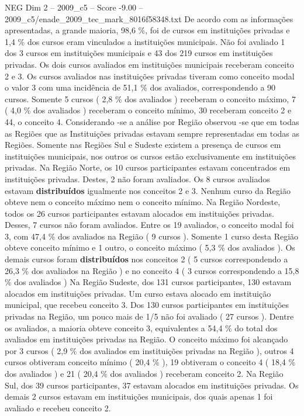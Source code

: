 \begin{textsample}{NEG Dim 2 – 2009\_c5 – Score -9.00 – 2009\_c5/enade\_2009\_tec\_mark\_8016f58348.txt}
De acordo com as informações apresentadas, a grande maioria, 98,6 \%, foi de cursos em instituições privadas e 1,4 \% dos cursos eram vinculados a instituições municipais.
Não foi avaliado 1 dos 3 cursos em instituições municipais e 43 dos 219 cursos em instituições privadas.
Os dois cursos avaliados em instituições municipais receberam conceito 2 e 3.
Os cursos avaliados nas instituições privadas tiveram como conceito modal o valor 3 com uma incidência de 51,1 \% dos avaliados, correspondendo a 90 cursos.
Somente 5 cursos ( 2,8 \% dos avaliados ) receberam o conceito máximo, 7 ( 4,0 \% dos avaliados ) receberam o conceito mínimo, 30 receberam conceito 2 e 44, o conceito 4.
Considerando -se a análise por Região observou -se que em todas as Regiões que as Instituições privadas estavam sempre representadas em todas as Regiões.
Somente nas Regiões Sul e Sudeste existem a presença de cursos em instituições municipais, nos outros os cursos estão exclusivamente em instituições privadas.
Na Região Norte, os 10 cursos participantes estavam concentrados em instituições privadas.
Destes, 2 não foram avaliados.
Os 8 cursos avaliados estavam \textbf{distribuídos} igualmente nos conceitos 2 e 3.
Nenhum curso da Região obteve nem o conceito máximo nem o conceito mínimo.
Na Região Nordeste, todos os 26 cursos participantes estavam alocados em instituições privadas.
Desses, 7 cursos não foram avaliados.
Entre os 19 avaliados, o conceito modal foi 3, com 47,4 \% dos avaliados na Região ( 9 cursos ).
Somente 1 curso desta Região obteve conceito mínimo e 1 outro, o conceito máximo ( 5,3 \% dos avaliados ).
Os demais cursos foram \textbf{distribuídos} nos conceitos 2 ( 5 cursos correspondendo a 26,3 \% dos avaliados na Região ) e no conceito 4 ( 3 cursos correspondendo a 15,8 \% dos avaliados ) Na Região Sudeste, dos 131 cursos participantes, 130 estavam alocados em instituições privadas.
Um curso estava alocado em instituição municipal, que recebeu conceito 3.
Dos 130 cursos participantes em instituições privadas na Região, um pouco mais de 1/5 não foi avaliado ( 27 cursos ).
Dentre os avaliados, a maioria obteve conceito 3, equivalentes a 54,4 \% do total dos avaliados em instituições privadas na Região.
O conceito máximo foi alcançado por 3 cursos ( 2,9 \% dos avaliados em instituições privadas na Região ), outros 4 cursos obtiveram conceito mínimo ( 20,4 \% ), 19 obtiveram o conceito 4 ( 18,4 \% dos avaliados ) e 21 ( 20,4 \% dos avaliados ) receberam conceito 2.
Na Região Sul, dos 39 cursos participantes, 37 estavam alocados em instituições privadas.
Os demais 2 cursos estavam em instituições municipais, dos quais apenas 1 foi avaliado e recebeu conceito 2.

\end{textsample}
